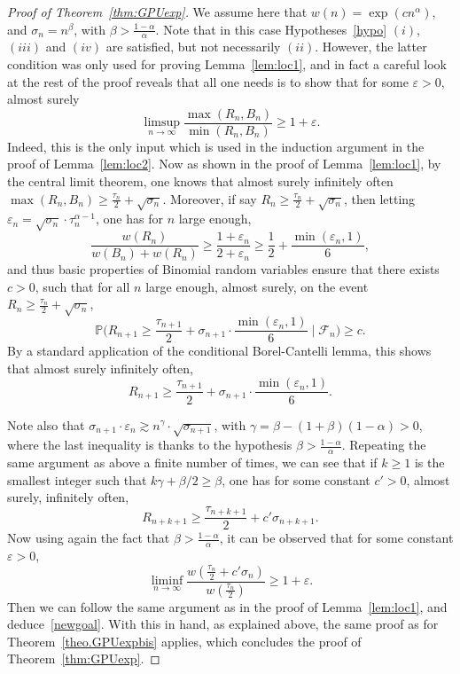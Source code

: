 \documentclass[10pt,a4paper]{amsart}
\newcommand{\1}{{\text{\Large $\mathfrak 1$}}}
\begin{document}
\begin{proof}[Proof of Theorem~\ref{thm:GPUexp}]
We assume here that $w(n) = \exp(cn^\alpha)$, and $\sigma_n = n^\beta$, with $\beta> \frac{1-\alpha}{\alpha}$. 
Note that in this case Hypotheses~\ref{hypo} $(i)$, $(iii)$ and $(iv)$ are satisfied, but not necessarily $(ii)$. However, the latter condition was only used for proving Lemma~\ref{lem:loc1}, and in fact a careful look at the rest of the proof reveals that all one needs is to show that for some $\varepsilon>0$, almost surely 
\begin{equation}\label{newgoal}
\limsup_{n\to \infty} \frac{\max(R_n,B_n)}{\min(R_n,B_n)} \ge 1+\varepsilon. 
\end{equation} 
Indeed, this is the only input which is used in the induction argument in the proof of Lemma~\ref{lem:loc2}. 
Now as shown in the proof of Lemma~\ref{lem:loc1}, by the central limit theorem, one knows that almost surely infinitely often $\max(R_n,B_n) \ge \frac{\tau_n}{2} +\sqrt{\sigma_n}$. 
 Moreover, if say $R_n \ge \frac{\tau_n}{2} + \sqrt{\sigma_n}$, then letting $\varepsilon_n = \sqrt{\sigma_n} \cdot \tau_n^{\alpha-1}$, one has for $n$ large enough, 
$$ \frac{w(R_n)}{w(B_n) + w(R_n)} \ge \frac{1+\varepsilon_n}{2+\varepsilon_n}\ge \frac 12 + \frac{\min(\varepsilon_n, 1)}{6},$$ and thus basic properties of Binomial random variables ensure that there exists $c>0$, such that for all $n$ large enough, almost surely, on the event $R_n \ge \frac{\tau_n}{2} + \sqrt{\sigma_n}$, 
$$\mathbb P\big(R_{n+1}\ge \frac{\tau_{n+1}}2 +  \sigma_{n+1}\cdot \frac{\min(\varepsilon_n,1)}{6} \mid \mathcal F_n\big)\ge c. $$  
By a standard application of the conditional Borel-Cantelli lemma, this shows that almost surely infinitely often, 
$$R_{n+1} \ge  \frac{\tau_{n+1}}2 +  \sigma_{n+1}\cdot \frac{\min(\varepsilon_n,1)}{6}.$$

Note also that $\sigma_{n+1}\cdot \varepsilon_n \gtrsim n^\gamma\cdot \sqrt{\sigma_{n+1}}$, with $\gamma =  \beta -(1+\beta)(1- \alpha) > 0$, where the last inequality is thanks to the hypothesis $\beta> \frac{1-\alpha}{\alpha}$. Repeating the same argument as above a finite number of times, we can see that if $k\ge 1$ is the smallest integer such that 
$k\gamma + \beta/2 \ge \beta$, one has for some constant $c'>0$, almost surely, infinitely often,  
$$R_{n+k+1} \ge  \frac{\tau_{n+k+1}}{2} + c'\sigma_{n+k+1}. $$
Now using again the fact that $\beta> \frac{1-\alpha}{\alpha}$, it can be observed that for some constant $\varepsilon>0$, 
$$\liminf_{n\to \infty} \frac{w(\frac{\tau_n}{2} + c'\sigma_n) }{w(\frac{\tau_n}{2} ) }\ge 1+ \varepsilon.$$ 
Then we can follow the same argument as in the proof of Lemma~\ref{lem:loc1}, and deduce~\eqref{newgoal}. 
With this in hand, as explained above, the same proof as for Theorem~\ref{theo.GPUexpbis} applies, which concludes the proof of Theorem~\ref{thm:GPUexp}. 
\end{proof}
\end{document}
